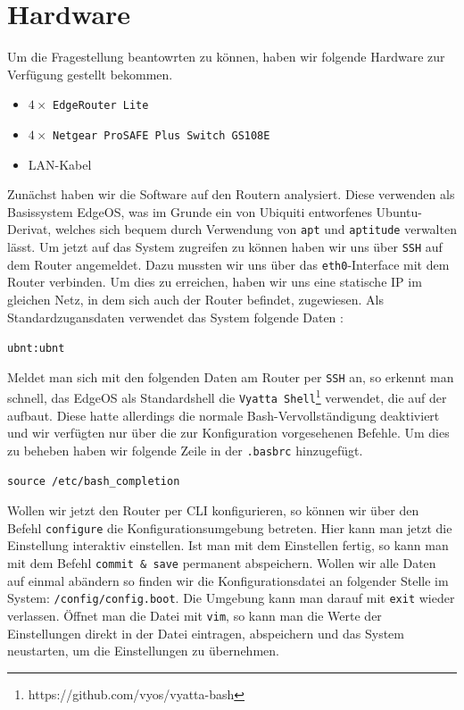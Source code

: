 \documentclass[11pt,a4paper]{article}
\begin{document}
\section{Hardware}

Um die Fragestellung beantowrten zu können, haben wir folgende
Hardware zur Verfügung gestellt bekommen.
\begin{itemize}
\item $4\times$ \texttt{EdgeRouter Lite}
\item $4\times$ \texttt{Netgear ProSAFE Plus Switch GS108E}
\item LAN-Kabel
\end{itemize}
Zunächst haben wir die Software auf den Routern analysiert. Diese
verwenden als Basissystem EdgeOS, was im Grunde ein von Ubiquiti
entworfenes Ubuntu-Derivat, welches sich bequem durch Verwendung von
\texttt{apt} und \texttt{aptitude} verwalten lässt. Um jetzt auf das
System zugreifen zu können haben wir uns über \texttt{SSH} auf dem
Router angemeldet. Dazu mussten wir uns über das
\texttt{eth0}-Interface mit dem Router verbinden. Um dies zu
erreichen, haben wir uns eine statische IP im gleichen Netz, in dem
sich auch der Router befindet, zugewiesen. Als Standardzugansdaten
verwendet das System folgende Daten : 
\begin{center}
  \texttt{ubnt:ubnt} \\
\end{center}
Meldet man sich mit den folgenden Daten am Router per \texttt{SSH} an,
so erkennt man schnell, das EdgeOS als Standardshell die
\texttt{Vyatta Shell}\footnote[1]{https://github.com/vyos/vyatta-bash}
verwendet, die auf der  aufbaut. Diese hatte allerdings
die normale Bash-Vervollständigung deaktiviert und wir verfügten nur
über die zur Konfiguration vorgesehenen Befehle. Um dies zu beheben haben wir folgende Zeile in der \texttt{.basbrc} hinzugefügt.
\lstset{
  basicstyle=\footnotesize, frame=tb,
  xleftmargin=.05\textwidth, xrightmargin=.05\textwidth
}
\begin{lstlisting}
source /etc/bash_completion
\end{lstlisting}

Wollen wir jetzt den Router per CLI konfigurieren, so können wir über
den Befehl \texttt{configure} die Konfigurationsumgebung
betreten. Hier kann man jetzt die Einstellung interaktiv
einstellen. Ist man mit dem Einstellen fertig, so kann man mit dem
Befehl \texttt{commit \& save} permanent abspeichern. Wollen wir alle
Daten auf einmal abändern so finden wir die Konfigurationsdatei an
folgender Stelle im System: \texttt{/config/config.boot}. Die Umgebung
kann man darauf mit \texttt{exit} wieder verlassen. Öffnet man die
Datei mit \texttt{vim}, so kann man die Werte der Einstellungen direkt
in der Datei eintragen, abspeichern und das System neustarten, um die
Einstellungen zu übernehmen.
\end{document}
